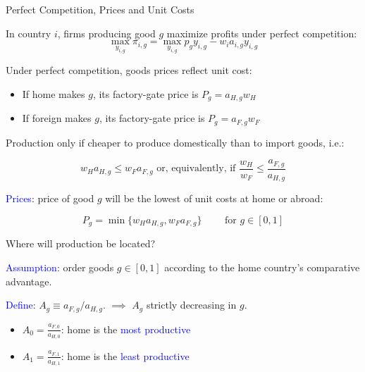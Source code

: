 \documentclass[notes,11pt, aspectratio=169, xcolor=table]{beamer}
\newcommand{\blue}[1]{\textcolor{blue}{#1}}
\newenvironment{wideitemize}{\itemize\addtolength{\itemsep}{10pt}}{\enditemize}
\begin{document}
\begin{frame}{Perfect Competition, Prices and Unit Costs}
\begin{wideitemize}
        \item In country $i$, firms producing good $g$ maximize profits under perfect competition:
        \begin{equation*}
            \max_{y_{i,g}} \pi_{i,g} = \max_{y_{i,g}} p_{g} y_{i,g} - w_i a_{i,g} y_{i,g} 
        \end{equation*}

        \item Under perfect competition, goods prices reflect unit cost:
        \begin{itemize}
            \item If home makes $g$, its factory-gate price is $P_g = a_{H,g} w_{H}$
            \item If foreign makes $g$, its factory-gate price is $P_g = a_{F,g} w_{F}$
        \end{itemize}
    \item Production only if cheaper to produce domestically than to import goods, i.e.:

    \begin{equation*}
        w_H a_{H,g} \le w_F a_{F,g} \text{ or, equivalently, if } \frac{w_H}{w_F} \le  \frac{a_{F,g}}{a_{H,g}}
    \end{equation*}

    \item \blue{Prices}: price of good $g$ will be the lowest of unit costs at home or abroad:


        \begin{equation*}
            P_{g} = \min\{w_H a_{H,g}, w_F a_{F,g}\}  \qquad \text{ for } g \in [0,1]
        \end{equation*}
        \end{wideitemize}
\end{frame}


\begin{frame}{Where will production be located?}
\begin{wideitemize}
    \item \blue{Assumption}: order goods $g \in [0,1]$ according to the home country's comparative advantage.

     \item \blue{Define}: $A_g \equiv  a_{F,g}/ a_{H,g}$. $\implies$ $A_g$ strictly decreasing in $g$.

     \begin{itemize}
         \item $A_0= \frac{a_{F,0}}{a_{H,0}}$: home is the \blue{most productive}
         \item $A_1= \frac{a_{F,1}}{a_{H,1}}$: home is the \blue{least productive} 
     \end{itemize}

            
        \end{wideitemize}
\end{frame}
\end{document}
